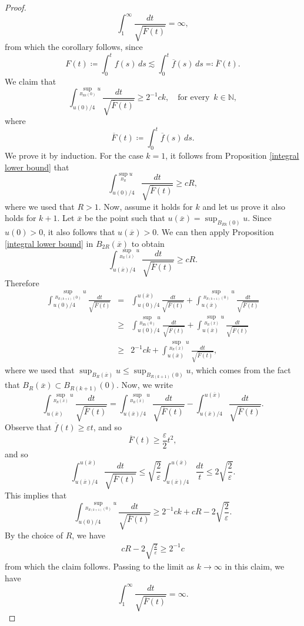 \documentclass[12pt,a4paper]{amsart}
\numberwithin{equation}{section} %
\theoremstyle{definition}
\theoremstyle{remark}
\begin{document}
\begin{proof}
$$
    \int_{1}^\infty \frac{dt}{\sqrt{\overline{F}(t)}} = \infty,
$$
from which the corollary follows, since 
$$
    F(t) \coloneqq \int_{0}^tf(s)\,ds \lesssim \int_{0}^t\overline{f}(s)\,ds \eqqcolon \overline{F}(t).
$$
We claim that
$$
	\int_{u(0)/4}^{\sup_{B_{Rk}(0)}u}\frac{dt}{\sqrt{\overline{F}(t)}} \geq 2^{-1}ck, \quad \text{for every }\, k \in \mathbb{N},
$$
where
$$
    \overline{F}(t) \coloneqq \int_{0}^t\overline{f}(s)\,ds.
$$
We prove it by induction. For the case $k=1$, it follows from Proposition \ref{integral lower bound} that
$$
    \int_{u(0)/4}^{\sup_{B_R}u}\frac{dt}{\sqrt{\overline{F}(t)}} \geq cR,
$$
where we used that $R>1$. Now, assume it holds for $k$ and let us prove it also holds for $k+1$. Let $\overline{x}$ be the point such that $u(\overline{x}) = \sup_{B_{Rk}(0)} u$. Since $u(0) > 0$, it also follows that $u(\overline{x}) > 0$. We can then apply Proposition \ref{integral lower bound} in $B_{2R}(\overline{x})$ to obtain
$$
	\int_{u(\overline{x})/4}^{\sup_{B_R(\overline{x})}u}\frac{dt}{\sqrt{\overline{F}(t)}} \geq cR.
$$
Therefore
\begin{eqnarray*}
	\int_{u(0)/4}^{\sup_{B_{R(k+1)}(0)}u} \frac{dt}{\sqrt{\overline{F}(t)}} & = & \int_{u(0)/4}^{u(\overline{x})} \frac{dt}{\sqrt{\overline{F}(t)}} + \int_{u(\overline{x})}^{\sup_{B_{R(k+1)}(0)}u}\frac{dt}{\sqrt{\overline{F}(t)}}\\
	& \geq & \int_{u(0)/4}^{\sup_{B_{Rk}(0)} u} \frac{dt}{\sqrt{\overline{F}(t)}} + \int_{u(\overline{x})}^{\sup_{B_R(\overline{x})}u}\frac{dt}{\sqrt{\overline{F}(t)}}\\
	& \geq & 2^{-1}ck + \int_{u(\overline{x})}^{\sup_{B_{R}(\overline{x})}u}\frac{dt}{\sqrt{\overline{F}(t)}},
\end{eqnarray*}
where we used that $\sup_{B_R(\overline{x})}u \leq \sup_{B_{R(k+1)}(0)}u$, which comes from the fact that $B_R(\overline{x}) \subset B_{R(k+1)}(0)$. Now, we write
$$
	\int_{u(\overline{x})}^{\sup_{B_{R}(\overline{x})}u}\frac{dt}{\sqrt{\overline{F}(t)}} = \int_{u(\overline{x})/4}^{\sup_{B_{R}(\overline{x})}u}\frac{dt}{\sqrt{\overline{F}(t)}} - \int_{u(\overline{x})/4}^{u(\overline{x})}\frac{dt}{\sqrt{\overline{F}(t)}}.
$$
Observe that $\overline{f}(t) \geq \varepsilon t$, and so
$$
	\overline{F}(t) \geq \frac{\varepsilon}{2}t^2,
$$
and so
$$
 \int_{u(\overline{x})/4}^{u(\overline{x})}\frac{dt}{\sqrt{\overline{F}(t)}} \leq \sqrt{\frac{2}{\varepsilon}}\int_{u(\overline{x})/4}^{u(\overline{x})}\frac{dt}{t} \leq 2\sqrt{\frac{2}{\varepsilon}}.
$$
This implies that
$$
	\int_{u(0)/4}^{\sup_{B_{R(k+1)}(0)}u}\frac{dt}{\sqrt{\overline{F}(t)}} \geq 2^{-1}ck + cR  - 2\sqrt{\frac{2}{\varepsilon}}.
$$
By the choice of $R$, we have
\begin{eqnarray*}
   cR - 2\sqrt{\frac{2}{\varepsilon}} \geq 2^{-1}c
\end{eqnarray*}
from which the claim follows. Passing to the limit as $k \to \infty$ in this claim, we have
$$
    \int_{1}^\infty\frac{dt}{\sqrt{\overline{F}(t)}} = \infty.
$$
\end{proof}
\end{document}
